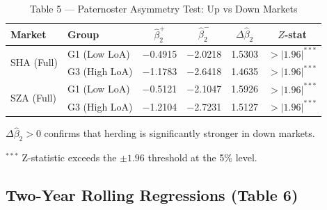 \documentclass[12pt, a4paper]{article}
\begin{document}
\begin{table}[H]
  \centering
  \caption{Table 5 — Paternoster Asymmetry Test: Up vs Down Markets}
  \label{tab:paternoster}
  \begin{threeparttable}
  \begin{tabular}{llcccc}
    \toprule
    Market & Group & $\hat\beta_2^{+}$ & $\hat\beta_2^{-}$ & $\Delta\hat\beta_2$ & $Z$-stat \\
    \midrule
    \multirow{2}{*}{SHA (Full)}
      & G1 (Low LoA)   & $-$0.4915 & $-$2.0218 & 1.5303 & $>|1.96|^{***}$ \\
      & G3 (High LoA)  & $-$1.1783 & $-$2.6418 & 1.4635 & $>|1.96|^{***}$ \\
    \multirow{2}{*}{SZA (Full)}
      & G1 (Low LoA)   & $-$0.5121 & $-$2.1047 & 1.5926 & $>|1.96|^{***}$ \\
      & G3 (High LoA)  & $-$1.2104 & $-$2.7231 & 1.5127 & $>|1.96|^{***}$ \\
    \bottomrule
  \end{tabular}
  \begin{tablenotes}
    \footnotesize
    \item $\Delta\hat\beta_2 > 0$ confirms that herding is significantly stronger in down markets.
    \item $^{***}$ Z-statistic exceeds the $\pm1.96$ threshold at the 5\% level.
  \end{tablenotes}
  \end{threeparttable}
\end{table}

\subsection{Two-Year Rolling Regressions (Table 6)}
\end{document}
